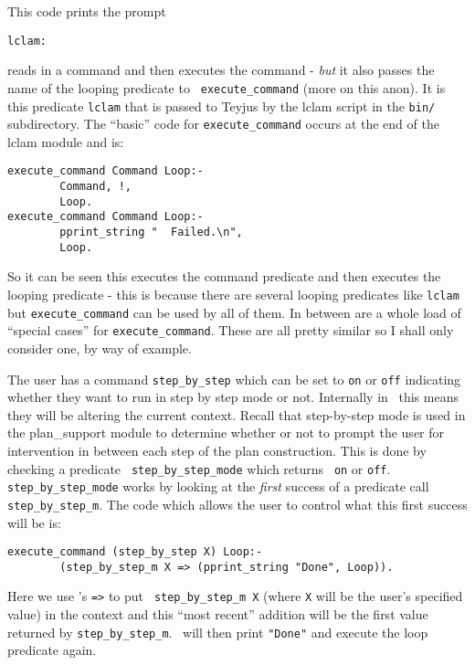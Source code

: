 This code prints the prompt 
\begin{verbatim}
lclam:
\end{verbatim}
reads in a command and then executes the command - {\em but} it also
passes the name of the looping predicate to {\tt
  execute\_command} (more on this anon).  It
is this predicate {\tt lclam} that is passed to 
Teyjus by the lclam script in the {\tt bin/}
subdirectory.  The ``basic'' code for {\tt execute\_command} occurs at 
the end of the lclam module and is:
\begin{verbatim}
execute_command Command Loop:-
        Command, !,
        Loop.
execute_command Command Loop:-
        pprint_string "  Failed.\n",
        Loop.
\end{verbatim}
So it can be seen this executes the command predicate and then
executes the looping predicate - this is because there are several
looping predicates like {\tt lclam} but {\tt execute\_command} can be
used by all of them.  In between are a whole load of ``special cases'' 
for {\tt execute\_command}.  These are all pretty similar so I shall
only consider one, by way of example.

The user has a command {\tt step\_by\_step}
which can be set to {\tt on} or {\tt off} indicating whether they want 
to run in step by step mode or not.
Internally in \lclam\ this means they will be altering the current
context.  Recall that step-by-step mode is used in the
plan\_support module to determine whether
or not to prompt the user for intervention in between each step of the 
plan construction.  This is done by checking a predicate {\tt
  step\_by\_step\_mode} which returns {\tt 
  on} or {\tt off}.  {\tt step\_by\_step\_mode} works by looking at
the {\em first} success of a predicate call {\tt
  step\_by\_step\_m}.  The code which allows
the user to control what this first success will be is:
\begin{verbatim}
execute_command (step_by_step X) Loop:-
        (step_by_step_m X => (pprint_string "Done", Loop)).
\end{verbatim}
Here we use \lprolog's {\tt =>}\index{=>} to put {\tt
  step\_by\_step\_m X} (where {\tt X} will be the user's specified
value) in the context and this ``most recent'' addition will be the
first value returned by {\tt step\_by\_step\_m}.  \lclam\ will then
print {\tt "Done"} and execute the loop predicate again.

